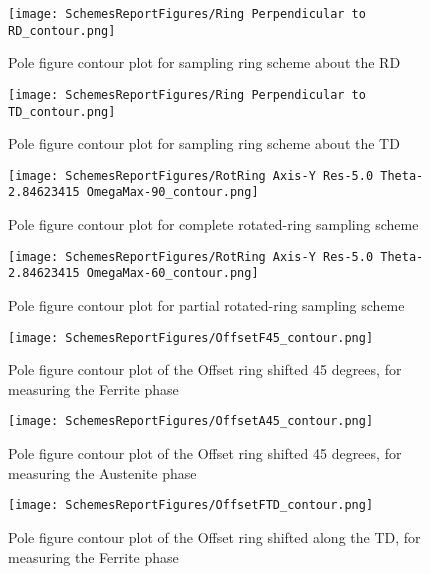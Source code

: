 \documentclass{article}
\begin{document}
\begin{figure}[H]
    \centering
    \texttt{[image: SchemesReportFigures/Ring Perpendicular to RD\_contour.png]}
    \caption{Pole figure contour plot for sampling ring scheme about the RD}
\end{figure}

\begin{figure}[H]
    \centering
    \texttt{[image: SchemesReportFigures/Ring Perpendicular to TD\_contour.png]}
    \caption{Pole figure contour plot for sampling ring scheme about the TD}
\end{figure}





\begin{figure}[H]
    \centering
    \texttt{[image: SchemesReportFigures/RotRing Axis-Y Res-5.0 Theta-2.84623415 OmegaMax-90\_contour.png]}
    \caption{Pole figure contour plot for complete rotated-ring sampling scheme}
\end{figure}

\begin{figure}[H]
    \centering
    \texttt{[image: SchemesReportFigures/RotRing Axis-Y Res-5.0 Theta-2.84623415 OmegaMax-60\_contour.png]}
    \caption{Pole figure contour plot for partial rotated-ring sampling scheme}
\end{figure}

\begin{figure}[H]
    \centering
    \texttt{[image: SchemesReportFigures/OffsetF45\_contour.png]}
    \caption{Pole figure contour plot of the Offset ring shifted 45 degrees, for measuring the Ferrite phase}
\end{figure}

\begin{figure}[H]
    \centering
    \texttt{[image: SchemesReportFigures/OffsetA45\_contour.png]}
    \caption{Pole figure contour plot of the Offset ring shifted 45 degrees, for measuring the Austenite phase}
\end{figure}

\begin{figure}[H]
    \centering
    \texttt{[image: SchemesReportFigures/OffsetFTD\_contour.png]}
    \caption{Pole figure contour plot of the Offset ring shifted along the TD, for measuring the Ferrite phase}
\end{figure}
\end{document}
